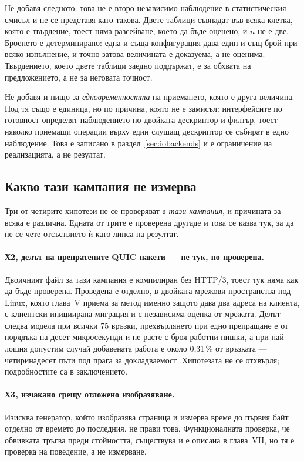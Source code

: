 Не добавя следното: това не е второ независимо наблюдение в статистическия смисъл и не се
представя като такова. Двете таблици съвпадат във всяка клетка, която е твърдение, тоест
няма разсейване, което да бъде оценено, и \(n\) не е две. Броенето е детерминирано: една и
съща конфигурация дава един
и същ брой при всяко изпълнение, и точно затова величината е доказуема, а не оценима.
Твърдението, което двете таблици заедно поддържат, е за обхвата на предложението, а не за
неговата точност.

Не добавя и нищо за \emph{едновременността} на приемането, която е друга величина. Под
 тя също е единица, но по причина, която не е замисъл: интерфейсите по
готовност определят наблюдението по двойката дескриптор и филтър, тоест няколко приемащи
операции върху един слушащ дескриптор се събират в едно наблюдение. Това е записано в
раздел~\ref{sec:iobackends} и е ограничение на реализацията, а не резултат.

\subsection{Какво тази кампания не измерва}
\label{sec:notmeasured}

Три от четирите хипотези не се проверяват \emph{в тази кампания}, и причината за всяка е различна.
Едната от трите е проверена другаде и това се казва тук, за да не се чете отсъствието ѝ като липса на
резултат.

\paragraph{Х2, делът на препратените QUIC пакети — не тук, но проверена.} Двоичният файл за тази
кампания е компилиран без HTTP/3, тоест тук няма как да бъде проверена. Проведена е отделно, в
двойката мрежови пространства под Linux, която глава~V приема за метод именно защото дава два адреса
на клиента, с клиентски инициирана миграция и с независима оценка от мрежата.
Делът следва модела при всички 75 връзки, прехвърлянето при едно препращане е от порядъка на десет
микросекунди и не расте с броя работни нишки, а при най-лошия допустим случай добавената работа е
около 0,31\,\% от връзката — четиринадесет пъти под прага за докладваемост. Хипотезата не се отхвърля; подробностите са в
заключението.

\paragraph{Х3, изчакано срещу отложено изобразяване.} Изисква генератор, който изобразява
страница и измерва време до първия байт отделно от времето до последния.  не
прави това. Функционалната проверка, че обвивката тръгва преди стойността, съществува и е
описана в глава~VII, но тя е проверка на поведение, а не измерване.

